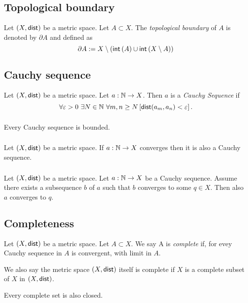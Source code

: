\subsection*{Topological boundary}
\udef Let $(X, \mathsf{dist})$ be a metric space. Let $A \subset X$.
The \emph{topological boundary} of $A$ is denoted by $\partial A$ and defined as
\[
    \partial A := X \setminus (\setint(A) \cup \setint (X \setminus A))
\]

\subsection{Cauchy sequence}
\udef Let $(X, \mathsf{dist})$ be a metric space. Let $a : \mathbb{N} \to X$. Then $a$ is a
\emph{Cauchy Sequence} if
\[
    \forall \varepsilon > 0\ \exists N \in \mathbb{N}\ \forall m,n \geq N \left[ \mathsf{dist}(a_m, a_n) < \varepsilon \right].
\]

\subsubsection*{}
\uprop Every Cauchy sequence is bounded.

\subsubsection*{}
\uprop Let $(X, \mathsf{dist})$ be a metric space. If $a : \mathbb{N} \to X$ converges then
it is also a Cauchy sequence.

\subsubsection*{}
\uprop Let $(X, \mathsf{dist})$ be a metric space.
Let $a : \mathbb{N} \to X$ be a Cauchy sequence. Assume there exists a subsequence $b$
of $a$ such that $b$ converges to some $q \in X$. Then also $a$ converges to $q$.

\subsection{Completeness}
\udef Let $(X, \mathsf{dist})$ be a metric space. Let $A \subset X$. We say A is
\emph{complete} if, for evey Cauchy sequence in $A$ is convergent,
with limit in $A$.

\par
We also say the metric space $(X, \mathsf{dist})$ itself is complete if $X$ is a complete
subset of $X$ in $(X, \mathsf{dist})$.

\par
Every complete set is also closed.

